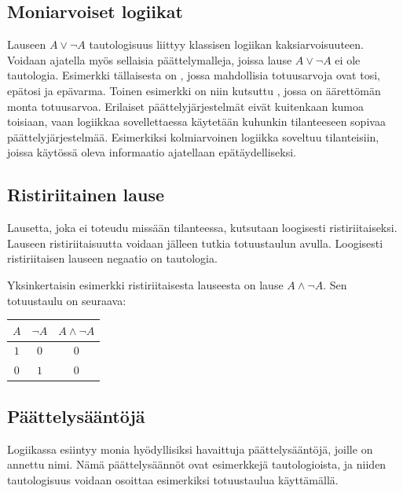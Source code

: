 \subsection*{Moniarvoiset logiikat}%
Lauseen $A \lor \lnot A$ tautologisuus liittyy klassisen logiikan kaksiarvoisuuteen. Voidaan ajatella myös sellaisia päättelymalleja, joissa lause $A \lor \lnot A$ ei ole tautologia. Esimerkki tällaisesta on , jossa mahdollisia totuusarvoja ovat tosi, epätosi ja epävarma.  Toinen esimerkki on niin kutsuttu , jossa on äärettömän monta totuusarvoa. Erilaiset päättelyjärjestelmät eivät kuitenkaan kumoa toisiaan, vaan logiikkaa sovellettaessa käytetään kuhunkin tilanteeseen sopivaa päättelyjärjestelmää. Esimerkiksi kolmiarvoinen logiikka soveltuu tilanteisiin, joissa käytössä oleva informaatio ajatellaan epätäydelliseksi.


\subsection*{Ristiriitainen lause}
Lausetta, joka ei toteudu missään tilanteessa, kutsutaan loogisesti ristiriitaiseksi. Lauseen ristiriitaisuutta voidaan jälleen tutkia totuustaulun avulla. Loogisesti ristiriitaisen lauseen negaatio on tautologia. 

Yksinkertaisin esimerkki ristiriitaisesta lauseesta on lause $A\land \lnot A$. Sen totuustaulu on seuraava:

\bigskip

\begin{center}
\begin{tabular}{|c|c|c|}\hline
$A$ & $\lnot A$ & $A \land  \lnot A$ \\ \hline
$1$ & $0$ & $0$\\
$0$ & $1$ & $0$\\ \hline
\end{tabular}
\end{center}

\bigskip


\subsection*{Päättelysääntöjä} Logiikassa esiintyy monia hyödyllisiksi havaittuja päättelysääntöjä, joille on annettu nimi. Nämä päättelysäännöt ovat esimerkkejä tautologioista, ja niiden tautologisuus voidaan osoittaa esimerkiksi totuustaulua käyttämällä.

